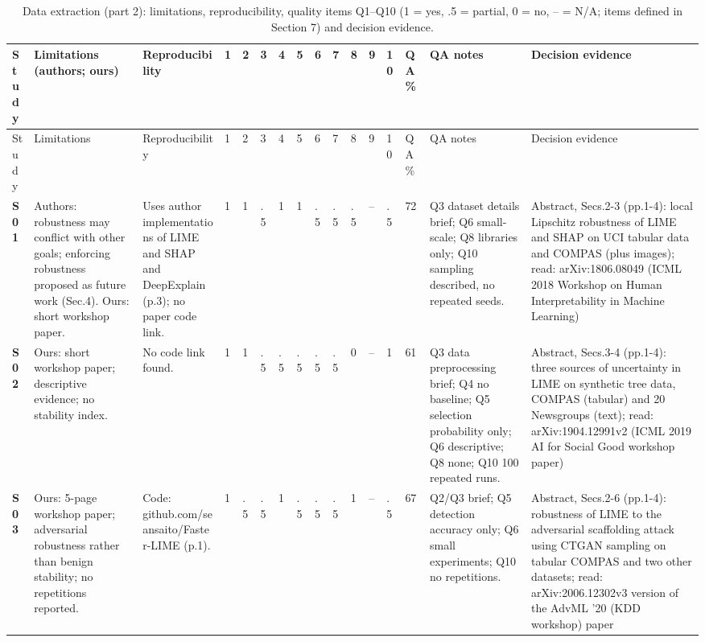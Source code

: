 \begin{longtable}{@{}P{1.0cm}P{4.6cm}P{3.6cm}P{0.3cm}P{0.3cm}P{0.3cm}P{0.3cm}P{0.3cm}P{0.3cm}P{0.3cm}P{0.3cm}P{0.3cm}P{0.36cm}P{0.75cm}P{3.0cm}P{3.9cm}@{}}
\caption{Data extraction (part 2): limitations, reproducibility, quality items Q1--Q10 (1 = yes, .5 = partial, 0 = no, -- = N/A; items defined in Section 7) and decision evidence.}\label{tab:ext2}\\
\toprule Study & Limitations (authors; ours) & Reproducibility & 1 & 2 & 3 & 4 & 5 & 6 & 7 & 8 & 9 & 10 & QA\% & QA notes & Decision evidence \\ \midrule \endfirsthead
\toprule Study & Limitations & Reproducibility & 1 & 2 & 3 & 4 & 5 & 6 & 7 & 8 & 9 & 10 & QA\% & QA notes & Decision evidence \\ \midrule \endhead
\bottomrule \endfoot
\textbf{S01} & Authors: robustness may conflict with other goals; enforcing robustness proposed as future work (Sec.4). Ours: short workshop paper. & Uses author implementations of LIME and SHAP and DeepExplain (p.3); no paper code link. & 1 & 1 & .5 & 1 & 1 & .5 & .5 & .5 & -- & .5 & 72 & Q3 dataset details brief; Q6 small-scale; Q8 libraries only; Q10 sampling described, no repeated seeds. & Abstract, Secs.2-3 (pp.1-4): local Lipschitz robustness of LIME and SHAP on UCI tabular data and COMPAS (plus images); read: arXiv:1806.08049 (ICML 2018 Workshop on Human Interpretability in Machine Learning) \\
\textbf{S02} & Ours: short workshop paper; descriptive evidence; no stability index. & No code link found. & 1 & 1 & .5 & .5 & .5 & .5 & .5 & 0 & -- & 1 & 61 & Q3 data preprocessing brief; Q4 no baseline; Q5 selection probability only; Q6 descriptive; Q8 none; Q10 100 repeated runs. & Abstract, Secs.3-4 (pp.1-4): three sources of uncertainty in LIME on synthetic tree data, COMPAS (tabular) and 20 Newsgroups (text); read: arXiv:1904.12991v2 (ICML 2019 AI for Social Good workshop paper) \\
\textbf{S03} & Ours: 5-page workshop paper; adversarial robustness rather than benign stability; no repetitions reported. & Code: github.com/\allowbreak{}seansaito/\allowbreak{}Faster-LIME (p.1). & 1 & .5 & .5 & 1 & .5 & .5 & .5 & 1 & -- & .5 & 67 & Q2/\allowbreak{}Q3 brief; Q5 detection accuracy only; Q6 small experiments; Q10 no repetitions. & Abstract, Secs.2-6 (pp.1-4): robustness of LIME to the adversarial scaffolding attack using CTGAN sampling on tabular COMPAS and two other datasets; read: arXiv:2006.12302v3 version of the AdvML '20 (KDD workshop) paper \\

\end{longtable}
